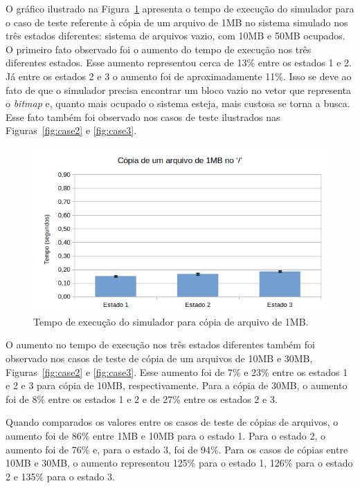 \documentclass[12pt]{article}
\begin{document}
O gráfico ilustrado na Figura~\ref{fig:case1} apresenta o tempo de execução do simulador para o caso de teste referente à cópia de um arquivo de 1MB no sistema simulado nos três estados diferentes: sistema de arquivos vazio, com 10MB e 50MB ocupados. O primeiro fato observado foi o aumento do tempo de execução nos três diferentes estados. Esse aumento representou cerca de 13\% entre os estados 1 e 2. Já entre os estados 2 e 3 o aumento foi de aproximadamente 11\%. Isso se deve ao fato de que o simulador precisa encontrar um bloco vazio no vetor que representa o \textit{bitmap} e, quanto mais ocupado o sistema esteja, mais custosa se torna a busca. Esse fato também foi observado nos casos de teste ilustrados nas Figuras~\ref{fig:case2} e \ref{fig:case3}.

\begin{figure}[H]
	\centering
	\includegraphics[width=1\textwidth]{case1.png}
	\caption{Tempo de execução do simulador para cópia de arquivo de 1MB.}
	\label{fig:case1}
\end{figure}

O aumento no tempo de execução nos três estados diferentes também foi observado nos casos de teste de cópia de um arquivos de 10MB e 30MB, Figuras~\ref{fig:case2} e \ref{fig:case3}. Esse aumento foi de 7\% e 23\% entre os estados 1 e 2 e 3 para cópia de 10MB, respectivamente. Para a cópia de 30MB, o aumento foi de 8\% entre os estados 1 e 2 e de 27\% entre os estados 2 e 3.

Quando comparados os valores entre os casos de teste de cópias de arquivos, o aumento foi de 86\% entre 1MB e 10MB para o estado 1. Para o estado 2, o aumento foi de 76\% e, para o estado 3, foi de 94\%. Para os casos de cópias entre 10MB e 30MB, o aumento representou 125\% para o estado 1, 126\% para o estado 2 e 135\% para o estado 3.
\end{document}
